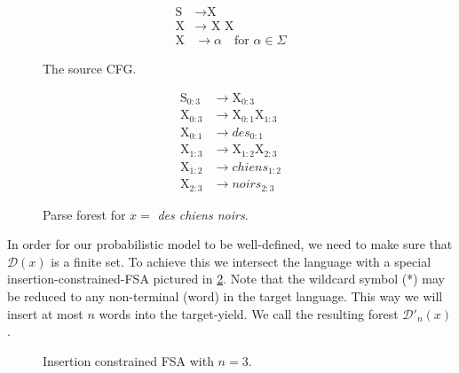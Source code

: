 \documentclass[11pt,a4paper]{article}
\begin{document}
\begin{figure}
\center
\begin{align*}
    \text{S} &\to \text{X} \\
    \text{X} &\to \text{ X X } \\
    \text{X} &\to \alpha \quad\text{for } \alpha\in \Sigma
\end{align*}
\caption{The source CFG.}
\label{fig:source-cfg}
\center
\begin{align*}
    \text{S}_{0:3} &\to \text{X}_{0:3} \\
    \text{X}_{0:3} &\to \text{X}_{0:1} \text{X}_{1:3} \\
    \text{X}_{0:1} &\to des_{0:1}  \\
    \text{X}_{1:3} &\to \text{X}_{1:2} \text{X}_{2:3} \\
    \text{X}_{1:2} &\to chiens_{1:2} \\
    \text{X}_{2:3} &\to noirs_{2:3}
\end{align*}
\caption{Parse forest for $x =$\textit{ des chiens noirs}.}
\label{fig:source-forest}
\end{figure}
In order for our probabilistic model to be well-defined, we need to make sure that $\mathcal{D}(x)$ is a finite set. To achieve this we intersect the language with a special insertion-constrained-FSA pictured in \ref{fig:eps-fsa}. Note that the wildcard symbol (*) may be reduced to any non-terminal (word) in the target language. This way we will insert at most $n$ words into the target-yield. We call the resulting forest $\mathcal{D}'_n(x)$. 
\begin{figure}[H]
\center
    \caption{Insertion constrained FSA with $n=3$.}
    \label{fig:eps-fsa}
\end{figure}
\end{document}
